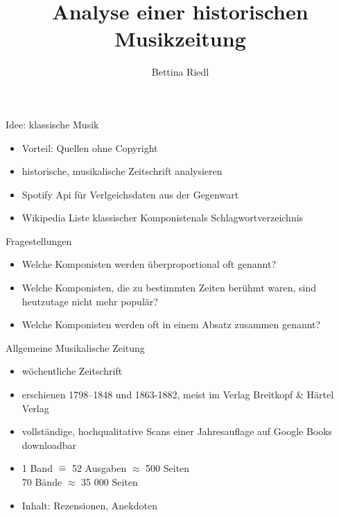 \documentclass{beamer}
\title{Analyse einer historischen Musikzeitung}
\author{Bettina Riedl}
\begin{document}
\begin{frame}[plain]
    \maketitle
\end{frame}
\note{}
\begin{frame}{Idee: klassische Musik}
	\begin{itemize}
		\pause
		\item Vorteil: Quellen ohne Copyright
		\pause
		\item historische, musikalische Zeitschrift analysieren
		\pause
		\item Spotify Api für Verlgeichsdaten aus der Gegenwart
		\pause
		\item Wikipedia \glqq Liste klassischer Komponisten\grqq als Schlagwortverzeichnis
	\end{itemize}
\begin{block}{Fragestellungen}
	\begin{itemize}
		\item Welche Komponisten werden überproportional oft genannt?
		\item Welche Komponisten, die zu bestimmten Zeiten berühmt waren, sind heutzutage nicht mehr populär?
		\item Welche Komponisten werden oft in einem Absatz zusammen genannt?
	\end{itemize}
\end{block}
\end{frame}
\begin{frame}{Allgemeine Musikalische Zeitung}
	\begin{itemize}
		\item wöchentliche Zeitschrift
		\item erschienen 1798–1848 und 1863-1882,  meist im Verlag \glqq Breitkopf \& Härtel Verlag\grqq
		\item vollständige, hochqualitative Scans einer Jahresauflage auf Google Books downloadbar
		\item 1 Band $\widehat{=}$ 52 Ausgaben $\approx$ 500 Seiten\\
		70 Bände $\approx$ 35 000 Seiten
		\item Inhalt: Rezensionen, Anekdoten
	\end{itemize}
\end{frame}
\end{document}
